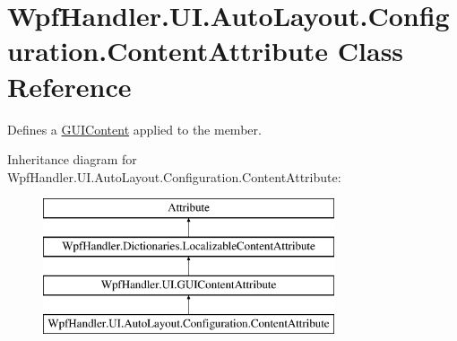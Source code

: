 \hypertarget{class_wpf_handler_1_1_u_i_1_1_auto_layout_1_1_configuration_1_1_content_attribute}{}\section{Wpf\+Handler.\+U\+I.\+Auto\+Layout.\+Configuration.\+Content\+Attribute Class Reference}
\label{class_wpf_handler_1_1_u_i_1_1_auto_layout_1_1_configuration_1_1_content_attribute}


Defines a \mbox{\hyperlink{class_wpf_handler_1_1_u_i_1_1_g_u_i_content}{G\+U\+I\+Content}} applied to the member.  


Inheritance diagram for Wpf\+Handler.\+U\+I.\+Auto\+Layout.\+Configuration.\+Content\+Attribute\+:\begin{figure}[H]
\begin{center}
\leavevmode
\includegraphics[height=4.000000cm]{d2/dfc/class_wpf_handler_1_1_u_i_1_1_auto_layout_1_1_configuration_1_1_content_attribute}
\end{center}
\end{figure}
